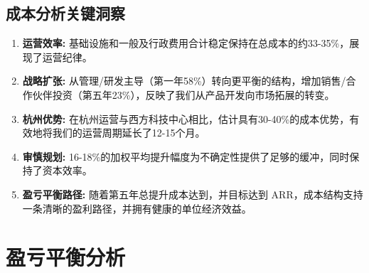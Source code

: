 \documentclass[11pt, a4paper, oneside]{article}
\begin{document}
\begin{table}[H]
\centering
\caption{基础设施与平台投资回报率}
\label{tab:infrastructure_roi}
\end{table}

\subsection{成本分析关键洞察}

\begin{enumerate}
    \item \textbf{运营效率:} 基础设施和一般及行政费用合计稳定保持在总成本的约33-35\%，展现了运营纪律。
    
    \item \textbf{战略扩张:} 从管理/研发主导（第一年58\%）转向更平衡的结构，增加销售/合作伙伴投资（第五年23\%），反映了我们从产品开发向市场拓展的转变。
    
    \item \textbf{杭州优势:} 在杭州运营与西方科技中心相比，估计具有30-40\%的成本优势，有效地将我们的运营周期延长了12-15个月。
    
    \item \textbf{审慎规划:} 16-18\%的加权平均提升幅度为不确定性提供了足够的缓冲，同时保持了资本效率。
    
    \item \textbf{盈亏平衡路径:} 随着第五年总提升成本达到，并目标达到 ARR，成本结构支持一条清晰的盈利路径，并拥有健康的单位经济效益。
\end{enumerate}



\section{盈亏平衡分析}
\end{document}
